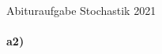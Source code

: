 \documentclass[12pt,a4paper]{report}
\begin{document}
	\noindent
	\Large
	Abituraufgabe Stochastik 2021
	\\[0.5cm]
	\large
	\paragraph{a2)}
\end{document}
